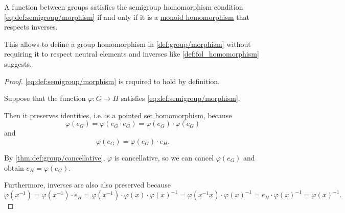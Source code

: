 \begin{proposition}\label{thm:group_homomorphism_single_condition}
  A function between groups satisfies the semigroup homomorphism condition \eqref{eq:def:semigroup/morphism} if and only if it is a \hyperref[def:monoid/morphism]{monoid homomorphism} that respects inverses.
\end{proposition}
\begin{comments}
  \item This allows to define a group homomorphism in \cref{def:group/morphism} without requiring it to respect neutral elements and inverses like \cref{def:fol_homomorphism} suggests.
\end{comments}
\begin{proof}
  \SufficiencySubProof \eqref{eq:def:semigroup/morphism} is required to hold by definition.

  \NecessitySubProof Suppose that the function \( \varphi: G \to H \) satisfies \eqref{eq:def:semigroup/morphism}.

  Then it preserves identities, i.e. is a \hyperref[def:pointed_set/morphism]{pointed set homomorphism}, because
  \begin{equation*}
    \varphi(e_G) = \varphi(e_G \cdot e_G) = \varphi(e_G) \cdot \varphi(e_G)
  \end{equation*}
  and
  \begin{equation*}
    \varphi(e_G) = \varphi(e_G) \cdot e_H.
  \end{equation*}

  By \cref{thm:def:group/cancellative}, \( \varphi \) is cancellative, so we can cancel \( \varphi(e_G) \) and obtain \( e_H = \varphi(e_G) \).

  Furthermore, inverses are also also preserved because
  \begin{equation*}
    \varphi(x^{-1})
    =
    \varphi(x^{-1}) \cdot e_H
    =
    \varphi(x^{-1}) \cdot \varphi(x) \cdot \varphi(x)^{-1}
    =
    \varphi(x^{-1} x) \cdot \varphi(x)^{-1}
    =
    e_H \cdot \varphi(x)^{-1}
    =
    \varphi(x)^{-1}.
  \end{equation*}
\end{proof}

